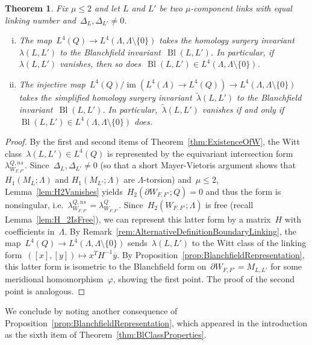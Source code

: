 \documentclass[10.9pt,a4paper]{amsart}
\newtheorem{theorem}{Theorem}[section]
\theoremstyle{definition}
\theoremstyle{remark}
\newcommand{\Bl}{\operatorname{Bl}}
\newcommand{\im}{\operatorname{im}}
\begin{document}
\begin{theorem}
\label{thm:RelatingInvariants}
Fix $\mu \leq 2$ and let $L$ and $L'$ be two $\mu$-component links with equal linking number and~$\Delta_L,\Delta_{L'} \neq 0$.
\begin{enumerate}[(i)]
\item The map~$L^4(Q) \to L^4(\Lambda,\Lambda \setminus \{0\})$ takes the homology surgery invariant~$\lambda(L,L')$ to the Blanchfield invariant~$\Bl(L,L')$.
In particular, if~$\lambda(L,L')$ vanishes, then so does~$\Bl(L,L') \in  L^4(\Lambda,\Lambda \setminus \{0\})$.
\item The injective map~$L^4(Q)/\im(L^4(\Lambda) \to L^4(Q)) \to L^4(\Lambda,\Lambda \setminus \{0\})$ takes the simplified homology surgery invariant~$\widetilde{\lambda}(L,L')$ to the Blanchfield invariant~$\Bl(L,L')$.
In particular,~$\widetilde{\lambda}(L,L')$ vanishes if and only if~$\Bl(L,L') \in  L^4(\Lambda,\Lambda \setminus \{0\})$ does.
\end{enumerate}
\end{theorem}
\begin{proof}
By the first and second items of Theorem~\ref{thm:ExistenceOfW}, the Witt class~$\lambda(L,L') \in L^4(Q)$ is represented by the equivariant intersection form~$\lambda_{W_{F,F'}}^{Q,\textit{ns}}$.
Since~$\Delta_L,\Delta_{L'} \neq 0$ (so that a short Mayer-Vietoris argument shows that~$H_1(M_L;\Lambda)$ and $H_1(M_{L'};\Lambda)$ are $\Lambda$-torsion) and~$\mu \le 2$, Lemma~\ref{lem:H2Vanishes} yields~$H_2(\partial W_{F,F'};Q)=0$ and thus the form is nonsingular, i.e.~$\lambda_{W_{F,F'}}^{Q,\textit{ns}}=\lambda_{W_{F,F'}}^Q$.
Since~$H_2(W_{F,F'};\Lambda)$ is free (recall Lemma~\ref{lem:H_2IsFree}), we can represent this latter form by a matrix~$H$ with coefficients in~$\Lambda$.
By Remark~\ref{rem:AlternativeDefinitionBoundaryLinking},  the map~$L^4(Q) \to L^4(\Lambda,\Lambda \setminus \{0\})$ sends~$\lambda(L,L')$ to the Witt class of the linking form~$([x],[y])\mapsto x^TH^{-1}\overline{y}$.
By Proposition~\ref{prop:BlanchfieldRepresentation}, this latter form is isometric to the Blanchfield form on~$\partial W_{F,F'}=M_{L,L'}$ for some meridional homomorphism~$\varphi$, showing the first point.
The proof of the second point is analogous.
\end{proof}

We conclude by noting another consequence of Proposition~\ref{prop:BlanchfieldRepresentation},
 which appeared in the introduction as the sixth item of Theorem~\ref{thm:BlClassProperties}.
\end{document}
